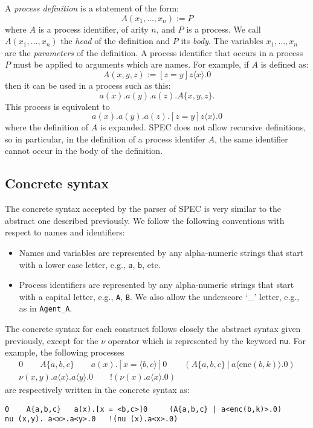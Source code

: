 \documentclass{article}
\begin{document}
A {\em process definition} is a statement of the form:
$$
A(x_1,\ldots,x_n) := P
$$
where $A$ is a process identifier, of arity $n$, and $P$ is a process. 
We call $A(x_1,\ldots,x_n)$ the {\em head} of the definition and $P$ its {\em body}. 
The variables $x_1,\ldots,x_n$ are the {\em parameters} of the definition. 
A process identifier that occurs in a process $P$ must be applied to arguments which are names. 
For example, if $A$ is defined as:
$$
A(x,y,z) := [z=y] z\langle x \rangle.0
$$
then it can be used in a process such as this:
$$
a(x).a(y).a(z). A\{x,y,z\}.
$$
This process is equivalent to 
$$
a(x).a(y).a(z). [z=y] z\langle x \rangle.0
$$
where the definition of $A$ is expanded. 
SPEC does not allow recursive definitions, so in particular, in the definition of a process identifer $A$,
the same identifier cannot occur in the body of the definition. 

\subsection{Concrete syntax}

The concrete syntax accepted by the parser of SPEC is very similar to the abstract one described previously.
We follow the following conventions with respect to names and identifiers:
\begin{itemize}
\item Names and variables are represented by any alpha-numeric strings that start with a lower case letter, e.g., 
\texttt{a}, \texttt{b}, etc.
\item Process identifiers are represented by any alpha-numeric strings that start with a capital letter, e.g.,
\texttt{A}, \texttt{B}. We also allow the underscore `\_' letter, e.g., as in \texttt{Agent\_A}.
\end{itemize}
The concrete syntax for each construct follows closely the abstract syntax given previously, except for
the $\nu$ operator which is represented by the keyword \texttt{nu}. For example, 
the following processes 
$$
\begin{array}{l}
0 \qquad A\{a,b,c\} \qquad a(x).[x = \langle b, c\rangle]0 \qquad (A\{a,b,c\} ~ | ~ a\langle \mathrm{enc}(b,k)\rangle.0) \\
\nu (x,y). a\langle x \rangle.a\langle y\rangle.0  \qquad !(\nu (x). a\langle x \rangle.0)
\end{array}
$$
are respectively written in the concrete syntax as:
\begin{verbatim}
0    A{a,b,c}   a(x).[x = <b,c>]0     (A{a,b,c} | a<enc(b,k)>.0) 
nu (x,y). a<x>.a<y>.0   !(nu (x).a<x>.0)
\end{verbatim}
\end{document}
